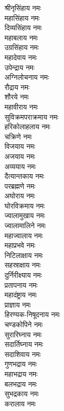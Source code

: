 \begin{multicols}{2}
\begin{flushleft}
श्रीनृसिंहाय नमः\\
महासिंहाय नमः\\
दिव्यसिंहाय नमः\\
महाबलाय नमः\\
उग्रसिंहाय नमः\\
महादेवाय नमः\\
उपेन्द्राय नमः\\
अग्निलोचनाय नमः\\
रौद्राय नमः\\
शौरये नमः\hfill{}\\
महावीराय नमः\\
सुविक्रमपराक्रमाय नमः\\
हरिकोलाहलाय नमः\\
चक्रिणे नमः\\
विजयाय नमः\\
अजयाय नमः\\
अव्ययाय नमः\\
दैत्यान्तकाय नमः\\
परब्रह्मणे नमः\\
अघोराय नमः\hfill{}\\
घोरविक्रमाय नमः\\
ज्वालामुखाय नमः\\
ज्वालामालिने नमः\\
महाज्वालाय नमः\\
महाप्रभवे नमः\\
निटिलाक्षाय नमः\\
सहस्राक्षाय नमः\\
दुर्निरीक्ष्याय नमः\\
प्रतापनाय नमः\\
महादंष्ट्राय नमः\hfill{}\\
प्राज्ञाय नमः\\
हिरण्यक-निषूदनाय नमः\\
चण्डकोपिने नमः\\
सुरारिघ्नाय नमः\\
सदार्तिघ्नाय नमः\\
सदाशिवाय नमः\\
गुणभद्राय नमः\\
महाभद्राय नमः\\
बलभद्राय नमः\\
सुभद्रकाय नमः\hfill{}\\
करालाय नमः\\

\end{flushleft}
\end{multicols}
